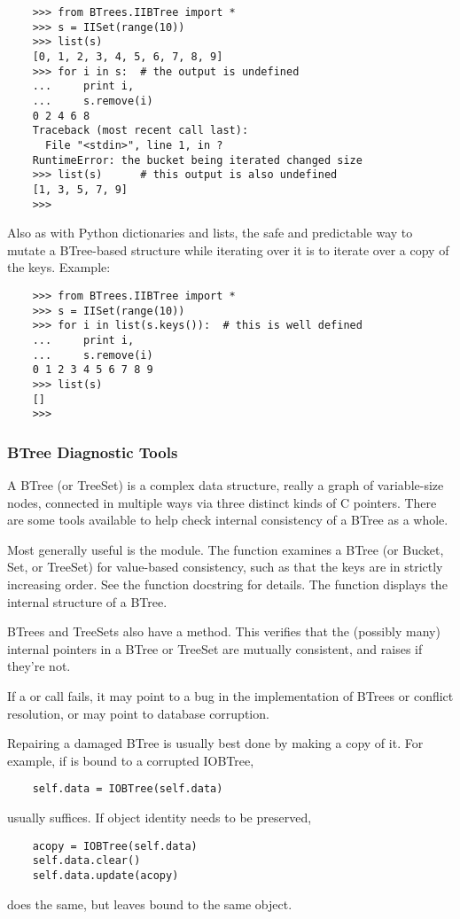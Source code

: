 \begin{verbatim}
    >>> from BTrees.IIBTree import *
    >>> s = IISet(range(10))
    >>> list(s)
    [0, 1, 2, 3, 4, 5, 6, 7, 8, 9]
    >>> for i in s:  # the output is undefined
    ...     print i,
    ...     s.remove(i)
    0 2 4 6 8
    Traceback (most recent call last):
      File "<stdin>", line 1, in ?
    RuntimeError: the bucket being iterated changed size
    >>> list(s)      # this output is also undefined
    [1, 3, 5, 7, 9]
    >>>
\end{verbatim}

Also as with Python dictionaries and lists, the safe and predictable way
to mutate a BTree-based structure while iterating over it is to iterate
over a copy of the keys.  Example:

\begin{verbatim}
    >>> from BTrees.IIBTree import *
    >>> s = IISet(range(10))
    >>> for i in list(s.keys()):  # this is well defined
    ...     print i,
    ...     s.remove(i)
    0 1 2 3 4 5 6 7 8 9
    >>> list(s)
    []
    >>>
\end{verbatim}


\subsubsection{BTree Diagnostic Tools}

A BTree (or TreeSet) is a complex data structure, really a graph of
variable-size nodes, connected in multiple ways via three distinct kinds
of C pointers.  There are some tools available to help check internal
consistency of a BTree as a whole.

Most generally useful is the  module.  The
 function examines a BTree (or Bucket, Set, or
TreeSet) for value-based consistency, such as that the keys are in
strictly increasing order.  See the function docstring for details.
The  function displays the internal structure
of a BTree.

BTrees and TreeSets also have a  method.  This verifies
that the (possibly many) internal pointers in a BTree or TreeSet
are mutually consistent, and raises  if they're
not.

If a  or  call fails,
it may point to a bug in the implementation of BTrees or conflict
resolution, or may point to database corruption.

Repairing a damaged BTree is usually best done by making a copy of it.
For example, if  is bound to a corrupted IOBTree,

\begin{verbatim}
    self.data = IOBTree(self.data)
\end{verbatim}

usually suffices.  If object identity needs to be preserved,

\begin{verbatim}
    acopy = IOBTree(self.data)
    self.data.clear()
    self.data.update(acopy)
\end{verbatim}

does the same, but leaves  bound to the same object.
